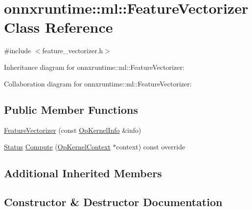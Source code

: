 \hypertarget{classonnxruntime_1_1ml_1_1FeatureVectorizer}{}\section{onnxruntime\+:\+:ml\+:\+:Feature\+Vectorizer Class Reference}
\label{classonnxruntime_1_1ml_1_1FeatureVectorizer}


{\ttfamily \#include $<$feature\+\_\+vectorizer.\+h$>$}



Inheritance diagram for onnxruntime\+:\+:ml\+:\+:Feature\+Vectorizer\+:


Collaboration diagram for onnxruntime\+:\+:ml\+:\+:Feature\+Vectorizer\+:
\subsection*{Public Member Functions}
\begin{DoxyCompactItemize}
\item 
\mbox{\hyperlink{classonnxruntime_1_1ml_1_1FeatureVectorizer_aef61902596c38b7251b8a6454abfe829}{Feature\+Vectorizer}} (const \mbox{\hyperlink{classonnxruntime_1_1OpKernelInfo}{Op\+Kernel\+Info}} \&info)
\item 
\mbox{\hyperlink{classonnxruntime_1_1common_1_1Status}{Status}} \mbox{\hyperlink{classonnxruntime_1_1ml_1_1FeatureVectorizer_afe6a02cf5385d469dd3a59ceb4661537}{Compute}} (\mbox{\hyperlink{classonnxruntime_1_1OpKernelContext}{Op\+Kernel\+Context}} $\ast$context) const override
\end{DoxyCompactItemize}
\subsection*{Additional Inherited Members}


\subsection{Constructor \& Destructor Documentation}
\mbox{\label{classonnxruntime_1_1ml_1_1FeatureVectorizer_aef61902596c38b7251b8a6454abfe829}} 
